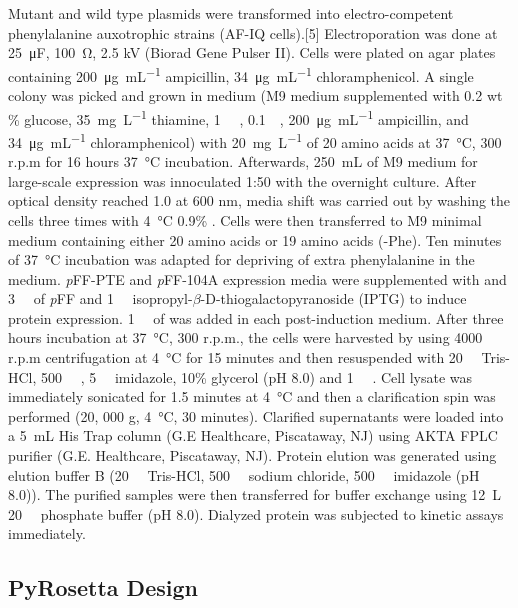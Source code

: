 \begin{refsection}
Mutant and wild type plasmids were transformed into electro-competent  phenylalanine auxotrophic strains (AF-IQ cells).[5] Electroporation was
done at \SI{25}{\micro\farad}, \SI{100}{\ohm}, 2.5 kV (Biorad Gene Pulser II).
Cells were plated on agar plates containing \SI{200}{\ug\per\mL} ampicillin,
\SI{34}{\ug\per\mL} chloramphenicol. A single colony was picked and grown in
medium (M9 medium supplemented with 0.2 wt \% glucose, \SI{35}{\mg\per\L}
thiamine, \SI{1}{\milli\Molar} , \SI{0.1}{\milli\Molar},
\SI{200}{\ug\per\mL} ampicillin, and \SI{34}{\ug\per\mL} chloramphenicol) with
\SI{20}{\mg\per\L} of 20 amino acids at \SI{37}{\celsius}, 300 r.p.m for 16
hours \SI{37}{\celsius} incubation.  Afterwards, \SI{250}{\mL} of M9 medium for
large-scale expression was innoculated 1:50 with the overnight culture.  After
optical density reached 1.0 at 600 nm, media shift was carried out by washing
the cells three times with \SI{4}{\celsius} 0.9\% . Cells were then
transferred to M9 minimal medium containing either 20 amino acids or 19 amino
acids (-Phe). Ten minutes of \SI{37}{\celsius} incubation was adapted for
depriving of extra phenylalanine in the medium. \emph{p}FF-PTE and
\emph{p}FF-104A expression media were supplemented with and
\SI{3}{\milli\Molar} of \emph{p}FF and \SI{1}{\milli\Molar}
isopropyl-$\beta$-D-thiogalactopyranoside (IPTG) to induce protein expression.
\SI{1}{\milli\Molar} of  was added in each post-induction medium.
After three hours incubation at \SI{37}{\celsius}, 300 r.p.m., the cells were
harvested by using 4000 r.p.m centrifugation at \SI{4}{\celsius} for 15 minutes
and then resuspended with \SI{20}{\milli\Molar} Tris-HCl,
\SI{500}{\milli\Molar} , \SI{5}{\milli\Molar} imidazole, 10\% glycerol
(pH 8.0) and \SI{1}{\micro\Molar} . Cell lysate was immediately
sonicated for 1.5 minutes at \SI{4}{\celsius} and then a clarification spin was
performed (20, 000 g, \SI{4}{\celsius}, 30 minutes).  Clarified supernatants
were loaded into a \SI{5}{\mL} His Trap column (G.E Healthcare, Piscataway, NJ)
using AKTA FPLC purifier (G.E.  Healthcare, Piscataway, NJ).  Protein elution
was generated using elution buffer B (\SI{20}{\milli\Molar} Tris-HCl,
\SI{500}{\milli\Molar} sodium chloride, \SI{500}{\milli\Molar} imidazole (pH
8.0)).  The purified samples were then transferred for buffer exchange using
\SI{12}{\L} \SI{20}{\milli\Molar} phosphate buffer (pH 8.0).  Dialyzed protein
was subjected to kinetic assays immediately.

\subsection{PyRosetta Design}
\label{sec:pyrosetta-method}


\end{refsection}

